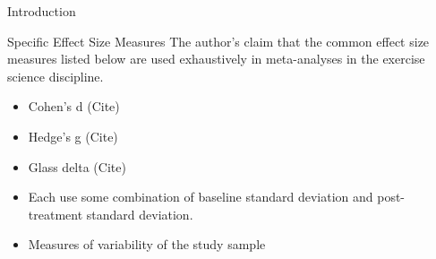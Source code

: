 \documentclass[
  ignorenonframetext,
  aspectratio=169,
]{beamer}
\begin{document}
\begin{frame}{Introduction}
\protect\hypertarget{introduction}{}
\begin{block}{Specific Effect Size Measures}
\protect\hypertarget{specific-effect-size-measures}{}
The author's claim that the common effect size measures listed below are
used exhaustively in meta-analyses in the exercise science discipline.

\begin{itemize}
\item
  Cohen's d (Cite)
\item
  Hedge's g (Cite)
\item
  Glass delta (Cite)
\item
  Each use some combination of baseline standard deviation and
  post-treatment standard deviation.
\item
  Measures of variability of the study sample
\end{itemize}
\end{block}
\end{frame}
\end{document}
